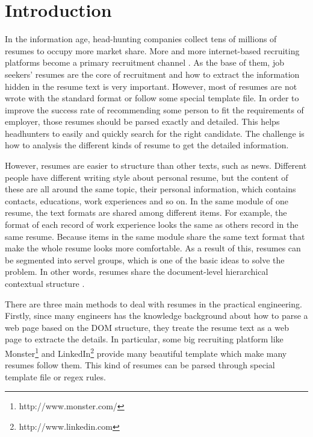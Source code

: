 \documentclass{acm_proc_article-sp}
\begin{document}



\section{Introduction}

In the information age, head-hunting companies collect tens of millions of resumes to occupy more market share.
More and more internet-based recruiting platforms become a primary recruitment channel \cite{al2012survey}.
As the base of them, job seekers' resumes are the core of recruitment and how to extract the information hidden in the resume text is very important.
However, most of resumes are not wrote with the standard format or follow some special template file.
In order to improve the success rate of recommending some person to fit the requirements of employer, those resumes should be parsed exactly and detailed.
This helps headhunters to easily and quickly search for the right candidate.
The challenge is how to analysis the different kinds of resume to get the detailed information.

However, resumes are easier to structure than other texts, such as news. 
Different people have different writing style about personal resume, but the content of these are all around the same topic, their personal information, which contains contacts, educations, work experiences and so on.
In the same module of one resume, the text formats are shared among different items.
For example, the format of each record of work experience looks the same as others record in the same resume.
Because items in the same module share the same text format that make the whole resume looks more comfortable.
As a result of this, resumes can be segmented into servel groups, which is one of the basic ideas to solve the problem.
In other words, resumes share the document-level hierarchical contextual structure \cite{maheshwari2010approach}.

There are three main methods to deal with resumes in the practical engineering. 
Firstly, since many engineers has the knowledge background about how to parse a web page based on the DOM structure, they treate the resume text as a web page to extracte the details. 
In particular, some big recruiting platform like Monster\footnote{http://www.monster.com/} and LinkedIn\footnote{http://www.linkedin.com} provide many beautiful template which make many resumes follow them.
This kind of resumes can be parsed through special template file or regex rules.
\end{document}
